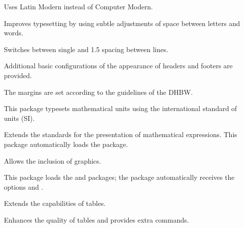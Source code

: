 \documentclass[babel=english,highlight=false]{skdoc}
\begin{document}
                \begin{description}[itemsep=1pt, style=multiline, leftmargin=3cm]
                    \item[\pkg{lmodern}] Uses Latin Modern instead of Computer Modern.
                    
                    \item[\pkg{microtype}] 
                    Improves typesetting by using subtle adjustments of space between letters and words.
                    
                    \item[\pkg{setspace}] 
                    Switches between single and 1.5 spacing between lines.
                    
                    \item [\pkg{scrlayer-srcpage}] Additional basic configurations of the appearance of headers and footers are provided.
                    
                    \item[\pkg{geometry}] The margins are set according to the guidelines of the DHBW.
                    
                    \item[\pkg{siunitx}] This package typesets mathematical units using the international standard of units (SI).
                    
                    \item[\pkg{mathtools}] Extends the standards for the presentation of mathematical expressions. This package automatically loads the  package.
                    
                    
                    \item[\pkg{graphicx}] Allows the inclusion of graphics.
                    
                    \item[\pkg{tcolorbox}] This package loads the  and  packages; the  package automatically receives the options  and .
                    
                    \item[\pkg{tabularx}] Extends the capabilities of tables.
                    
                    \item[\pkg{booktabs}] Enhances the quality of tables and provides extra commands.
                    

\end{description}
\end{document}
